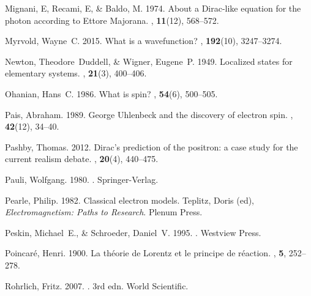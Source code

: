 \documentclass[12pt,secnumarabic,amsmath,amssymb,balancelastpage,nofootinbib]{article}
\begin{document}
\begin{thebibliography}{}
Mignani, E, Recami, E, \& Baldo, M. 1974.
\newblock About a Dirac-like equation for the photon according to Ettore
  Majorana.
, {\bf 11}(12), 568--572.

Myrvold, Wayne~C. 2015.
\newblock What is a wavefunction?
, {\bf 192}(10), 3247--3274.

Newton, Theodore~Duddell, \& Wigner, Eugene~P. 1949.
\newblock Localized states for elementary systems.
, {\bf 21}(3), 400--406.

Ohanian, Hans~C. 1986.
\newblock What is spin?
, {\bf 54}(6), 500--505.

Pais, Abraham. 1989.
\newblock George Uhlenbeck and the discovery of electron spin.
, {\bf 42}(12), 34--40.

Pashby, Thomas. 2012.
\newblock Dirac's prediction of the positron: a case study for the current
  realism debate.
, {\bf 20}(4), 440--475.

Pauli, Wolfgang. 1980.
.
\newblock Springer-Verlag.

Pearle, Philip. 1982.
\newblock Classical electron models.
 Teplitz, Doris (ed), {\em Electromagnetism:
  Paths to Research}.
\newblock Plenum Press.

Peskin, Michael~E., \& Schroeder, Daniel~V. 1995.
.
\newblock Westview Press.

Poincar\'{e}, Henri. 1900.
\newblock La th\'{e}orie de Lorentz et le principe de r\'{e}action.
,
  {\bf 5}, 252--278.

Rohrlich, Fritz. 2007.
. 3rd edn.
\newblock World Scientific.


\end{thebibliography}
\end{document}
